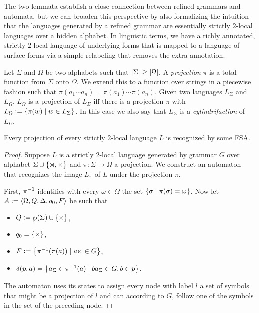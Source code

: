 The two lemmata establish a close connection between refined grammars and automata, but we can broaden this perspective by also formalizing the intuition that the languages generated by a refined grammar are essentially strictly $2$-local languages over a hidden alphabet.
In linguistic terms, we have a richly annotated, strictly $2$-local language of underlying forms that is mapped to a language of surface forms via a simple relabeling that removes the extra annotation.
%
\begin{definition}[Projection]
    Let $\Sigma$ and $\Omega$ be two alphabets such that $| \Sigma | \geq | \Omega |$.
    A \emph{projection} $\pi$ is a total function from $\Sigma$ onto $\Omega$.
    We extend this to a function over strings in a piecewise fashion such that $\pi(a_1 \cdots a_n) = \pi(a_1) \cdots \pi(a_n)$.
    Given two languages $L_\Sigma$ and $L_\Omega$, $L_\Omega$ is a projection of $L_\Sigma$ iff there is a projection $\pi$ with $L_\Omega \mathrel{\mathop:}= \left \{  \pi(w) \mid w \in L_\Sigma  \right \}$.
    In this case we also say that $L_\Sigma$ is a \emph{cylindrifaction} of $L_\Omega$.
\end{definition}
%
\begin{lemma}
    Every projection of every strictly $2$-local language $L$ is recognized by some FSA\@.
\end{lemma}
%
\begin{proof}
    Suppose $L$ is a strictly $2$-local language generated by grammar $G$ over alphabet $\Sigma \cup \left \{ \rtimes, \ltimes \right \}$ and $\pi: \Sigma \rightarrow \Omega$ a projection.
    We construct an automaton that recognizes the image $L_\pi$ of $L$ under the projection $\pi$.
    
    First, $\pi^{-1}$ identifies with every $\omega \in \Omega$ the set $\left \{  \sigma \mid \pi(\sigma) = \omega  \right \}$.
    Now let $A \mathrel{\mathop:}= \left \langle \Omega, Q, \Delta, q_0, F \right \rangle $ be such that
    \begin{itemize}
        \item $Q \mathrel{\mathop:}= \wp(\Sigma) \cup \left \{  \rtimes  \right \}$,
        \item $q_0 = \left \{  \rtimes  \right \}$,
        \item $F \mathrel{\mathop:}= \left \{  \pi^{-1}(\pi(a)) \mid \mathit{a \ltimes} \in G  \right \}$,
        \item $\delta(p,a) = \left \{  a_\Sigma \in \pi^{-1}(a) \mid b a_\Sigma \in G, b \in p \right \}$. 
    \end{itemize}
    The automaton uses its states to assign every node with label $l$ a set of symbols that might be a projection of $l$ and can according to $G$, follow one of the symbols in the set of the preceding node.
\end{proof}

